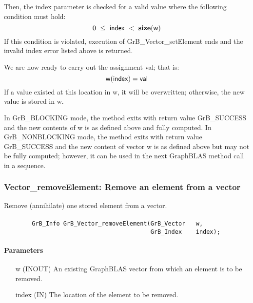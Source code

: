 Then, the {\sf index} parameter is checked for a valid value where the following
condition must hold:
\[
	0\ \leq\ {\sf index}\ <\ \mathbf{size}({\sf w})
\]
If this condition is violated, execution of {\sf GrB\_Vector\_setElement} 
ends and the invalid index error listed above is returned.

We are now ready to carry out the assignment {\sf val}; that is:
\[
    {\sf w}({\sf index}) = {\sf val}
\]
If a value existed at this location in {\sf w}, it will be overwritten; otherwise,
the new value is stored in {\sf w}.

In {\sf GrB\_BLOCKING} mode, the method exits with return value 
{\sf GrB\_SUCCESS} and the new contents of {\sf w} is as defined above
and fully computed.  
In {\sf GrB\_NONBLOCKING} mode, the method exits with return value 
{\sf GrB\_SUCCESS} and the new content of vector {\sf w} is as defined above 
but may not be fully computed; however, it can be used in the next GraphBLAS 
method call in a sequence.


\subsubsection{{\sf Vector\_removeElement}: Remove an element from a vector}

Remove (annihilate) one stored element from a vector.

\paragraph{\syntax}

\begin{verbatim}
        GrB_Info GrB_Vector_removeElement(GrB_Vector   w,
                                          GrB_Index    index);
\end{verbatim}

\paragraph{Parameters}

\begin{itemize}[leftmargin=1.1in]
    \item[{\sf w}]   ({\sf INOUT}) An existing GraphBLAS vector from which an 
    element is to be removed.

    \item[{\sf index}] ({\sf IN}) The location of the element to be removed.
\end{itemize}


